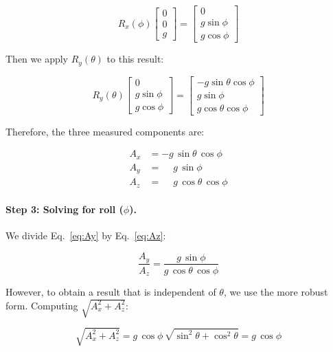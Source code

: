 \begin{equation}
  R_x(\phi)\begin{bmatrix} 0 \\ 0 \\ g \end{bmatrix}
  = \begin{bmatrix} 0 \\ g\sin\phi \\ g\cos\phi \end{bmatrix}
  \label{eq:Rx_g}
\end{equation}

\noindent Then we apply $R_y(\theta)$ to this result:

\begin{equation}
  R_y(\theta)\begin{bmatrix} 0 \\ g\sin\phi \\ g\cos\phi \end{bmatrix}
  = \begin{bmatrix}
      -g\sin\theta\cos\phi \\[2pt]
      g\sin\phi \\[2pt]
      g\cos\theta\cos\phi
    \end{bmatrix}
  \label{eq:Ry_Rx_g}
\end{equation}

\noindent Therefore, the three measured components are:

\begin{align}
  A_x &= -g\,\sin\theta\,\cos\phi \label{eq:Ax} \\
  A_y &= \phantom{-}g\,\sin\phi \label{eq:Ay} \\
  A_z &= \phantom{-}g\,\cos\theta\,\cos\phi \label{eq:Az}
\end{align}

\paragraph{Step 3: Solving for roll ($\phi$).}
We divide Eq.~\eqref{eq:Ay} by Eq.~\eqref{eq:Az}:

\begin{equation}
  \frac{A_y}{A_z}
  = \frac{g\,\sin\phi}{g\,\cos\theta\,\cos\phi}
  \label{eq:roll_ratio}
\end{equation}

\noindent However, to obtain a result that is independent of $\theta$, we use
the more robust form. Computing $\sqrt{A_x^2 + A_z^2}$:

\begin{equation}
  \sqrt{A_x^2 + A_z^2}
  = g\,\cos\phi\,\sqrt{\sin^2\!\theta + \cos^2\!\theta}
  = g\,\cos\phi
  \label{eq:Axz_norm}
\end{equation}


